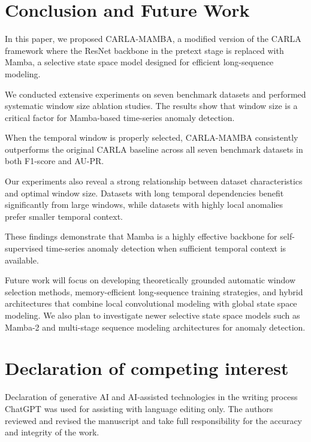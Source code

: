 \documentclass[runningheads]{llncs}
\begin{document}
\section{Conclusion and Future Work}

In this paper, we proposed CARLA-MAMBA, a modified version of the CARLA framework where the ResNet backbone in the pretext stage is replaced with Mamba, a selective state space model designed for efficient long-sequence modeling.

We conducted extensive experiments on seven benchmark datasets and performed systematic window size ablation studies. The results show that window size is a critical factor for Mamba-based time-series anomaly detection.

When the temporal window is properly selected, CARLA-MAMBA consistently outperforms the original CARLA baseline across all seven benchmark datasets in both F1-score and AU-PR.

Our experiments also reveal a strong relationship between dataset characteristics and optimal window size. Datasets with long temporal dependencies benefit significantly from large windows, while datasets with highly local anomalies prefer smaller temporal context.

These findings demonstrate that Mamba is a highly effective backbone for self-supervised time-series anomaly detection when sufficient temporal context is available.

Future work will focus on developing theoretically grounded automatic window selection methods, memory-efficient long-sequence training strategies, and hybrid architectures that combine local convolutional modeling with global state space modeling. We also plan to investigate newer selective state space models such as Mamba-2 and multi-stage sequence modeling architectures for anomaly detection.

\section*{Declaration of competing interest}
Declaration of generative AI and AI-assisted technologies in the writing process ChatGPT was used for assisting with language editing only. The authors reviewed and revised the manuscript and take full responsibility for the accuracy and integrity of the work.


\end{document}
